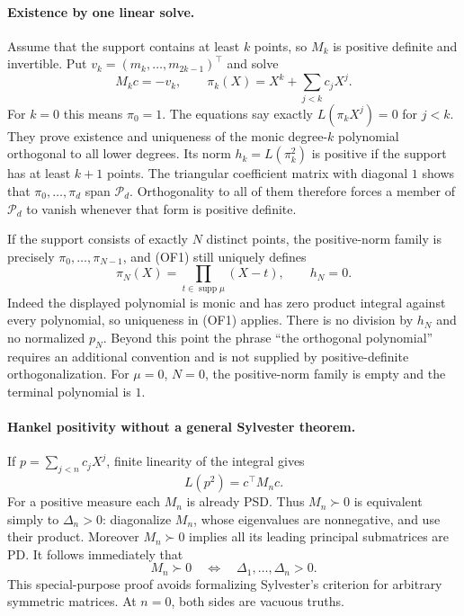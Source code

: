 \documentclass[11pt,a4paper]{article}
\theoremstyle{definition}
\begin{document}
\paragraph{Existence by one linear solve.}
Assume that the support contains at least $k$ points, so $M_k$ is positive
definite and invertible. Put $v_k=(m_k,\ldots,m_{2k-1})^\top$ and solve
\[
 M_kc=-v_k,\qquad \pi_k(X)=X^k+\sum_{j<k}c_jX^j.                 \tag{OF1}
\]
For $k=0$ this means $\pi_0=1$. The equations say exactly
$L(\pi_kX^j)=0$ for $j<k$. They prove existence and uniqueness of the monic
degree-$k$ polynomial orthogonal to all lower degrees. Its norm
$h_k=L(\pi_k^2)$ is positive if the support has at least $k+1$ points.
The triangular coefficient matrix with diagonal $1$ shows that
$\pi_0,\ldots,\pi_d$ span $\mathcal P_d$. Orthogonality to all of them
therefore forces a member of $\mathcal P_d$ to vanish whenever that form
is positive definite.

If the support consists of exactly $N$ distinct points, the positive-norm
family is precisely $\pi_0,\ldots,\pi_{N-1}$, and (OF1) still uniquely
defines
\[
 \pi_N(X)=\prod_{t\in\operatorname{supp}\mu}(X-t),\qquad h_N=0.   \tag{OF2}
\]
Indeed the displayed polynomial is monic and has zero product integral
against every polynomial, so uniqueness in (OF1) applies. There is no
division by $h_N$ and no normalized $p_N$. Beyond this point the phrase
``the orthogonal polynomial'' requires an additional convention and is
not supplied by positive-definite orthogonalization. For $\mu=0$, $N=0$,
the positive-norm family is empty and the terminal polynomial is $1$.

\paragraph{Hankel positivity without a general Sylvester theorem.}
If $p=\sum_{j<n}c_jX^j$, finite linearity of the integral gives
\[
 L(p^2)=c^\top M_nc.                                           \tag{OF3}
\]
For a positive measure each $M_n$ is already PSD. Thus $M_n\succ0$ is
equivalent simply to $\Delta_n>0$: diagonalize $M_n$, whose eigenvalues
are nonnegative, and use their product. Moreover $M_n\succ0$ implies all
its leading principal submatrices are PD. It follows immediately that
\[
 M_n\succ0\quad\Longleftrightarrow\quad
 \Delta_1,\ldots,\Delta_n>0.
\]
This special-purpose proof avoids formalizing Sylvester's criterion for
arbitrary symmetric matrices. At $n=0$, both sides are vacuous truths.
\end{document}
